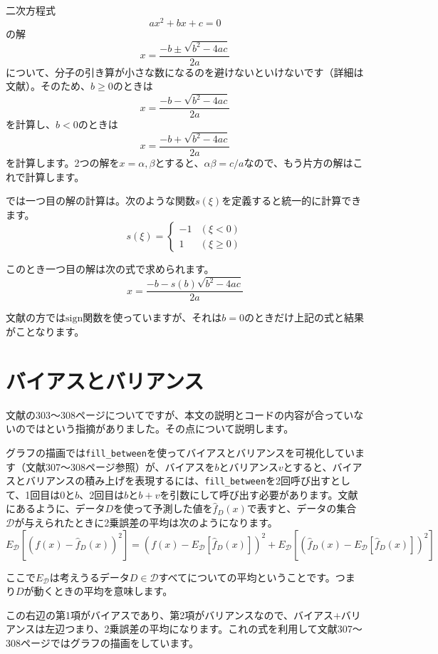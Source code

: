 \documentclass[11pt]{article}
\begin{document}
二次方程式
\[
ax^2 + bx +c =0
\]
の解
\[
x=\frac{-b \pm \sqrt{b^2-4ac}}{2a}
\]
について、分子の引き算が小さな数になるのを避けないといけないです（詳細は文献\cite{mle}）。そのため、$b\geq 0$のときは
\[
x=\frac{-b - \sqrt{b^2-4ac}}{2a}
\]
を計算し、$b<0$のときは
\[
x=\frac{-b + \sqrt{b^2-4ac}}{2a}
\]
を計算します。2つの解を$x = \alpha, \beta$とすると、$\alpha \beta = c/a$なので、もう片方の解はこれで計算します。

では一つ目の解の計算は。次のような関数$s(\xi)$を定義すると統一的に計算できます。
\[
s(\xi) =
\left\{
\begin{array}{ll}
-1 &(\xi <0)\\
1 & (\xi \geq 0)
\end{array}
\right.
\]

このとき一つ目の解は次の式で求められます。
\[
x=\frac{-b - s(b)\sqrt{b^2-4ac}}{2a}
\]

文献\cite{mle}の方では$\mathrm{sign}$関数を使っていますが、それは$b=0$のときだけ上記の式と結果がことなります。

\section{バイアスとバリアンス}

文献\cite{mle}の303〜308ページについてですが、本文の説明とコードの内容が合っていないのではという指摘がありました。その点について説明します。

グラフの描画では{\tt fill\_between}を使ってバイアスとバリアンスを可視化しています（文献\cite{mle}307〜308ページ参照）が、バイアスを$b$とバリアンス$v$とすると、バイアスとバリアンスの積み上げを表現するには、{\tt fill\_between}を2回呼び出すとして、1回目は$0$と$b$、2回目は$b$と$b+v$を引数にして呼び出す必要があります。文献\cite{mle}にあるように、データ$D$を使って予測した値を$\hat{f}_D(x)$で表すと、データの集合$\mathcal{D}$が与えられたときに2乗誤差の平均は次のようになります。
\begin{equation}\label{eq:bias-variance}
E_{\mathcal{D}} \left[
\left(f(x)-\hat{f}_D(x)\right)^2
\right]
=
\left(f(x)-E_{\mathcal{D}}
\left[\hat{f}_D(x)\right]
\right)^2
+ E_{\mathcal{D}}\left[
\left(\hat{f}_D(x) -
E_{\mathcal{D}}\left[\hat{f}_D(x)\right]\right)^2
\right]
\end{equation}

ここで$E_{\mathcal{D}}$は考えうるデータ$D\in \mathcal{D}$すべてについての平均ということです。つまり$D$が動くときの平均を意味します。

この右辺の第1項がバイアスであり、第2項がバリアンスなので、バイアス$+$バリアンスは左辺つまり、2乗誤差の平均になります。これの式を利用して文献\cite{mle}307〜308ページではグラフの描画をしています。
\end{document}
